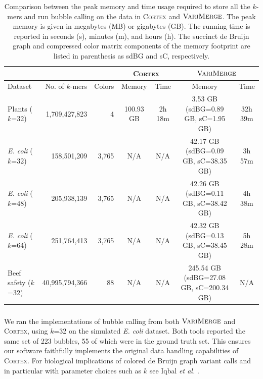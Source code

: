 \begin{sidewayspage}

\begin{table}[h]
\caption{Comparison between the peak memory and time usage required to store all the $k$-mers and run bubble calling on the data in \textsc{Cortex} and $\mbox{\rm {\sc VariMerge}}$.
The peak memory is given in megabytes (MB) or gigabytes (GB). The running time is reported in seconds (s), minutes (m), and hours (h).  The succinct de Bruijn graph and compressed color matrix components of the memory footprint are listed in parenthesis as sdBG and sC, respectively.}

  \centering
  \begin{tabular}{| l | r | r | c | c | c |c |}
\hline
\multicolumn{1}{|l}{}
& \multicolumn{1}{r}{}
& \multicolumn{1}{r}{}
& \multicolumn{2}{|c|}{\textsc{Cortex}}
& \multicolumn{2}{|c|}{$\mbox{\rm {\sc VariMerge}}$}  \\
\hline
Dataset & No. of $k$-mers & Colors & Memory & Time & Memory & Time \\
\hline
Plants	($k$=32)				& 1,709,427,823 	& 4 	& 100.93 GB 	& 2h 18m	& 3.53 GB (sdBG=0.89 GB, sC=1.95 GB) 	& 32h 39m \\
\emph{E. coli}  ($k$=32)         & 158,501,209       & 3,765 & N/A        & N/A      &  42.17 GB (sdBG=0.09 GB, sC=38.35 GB)     & 3h 57m  \\
\emph{E. coli}  ($k$=48)         & 205,938,139       & 3,765 & N/A        & N/A      &  42.26 GB (sdBG=0.11 GB, sC=38.42 GB)     & 4h 38m  \\
\emph{E. coli}  ($k$=64)         & 251,764,413       & 3,765 & N/A        & N/A      &  42.32 GB (sdBG=0.13 GB, sC=38.45 GB)     & 5h 28m  \\
Beef safety ($k$=32)                            & 40,995,794,366    & 88    & N/A        & N/A   & 245.54 GB (sdBG=27.08 GB, sC=200.34 GB)     & N/A \\
\hline
  \end{tabular}
\label{tbl-cosmo}
\end{table}
\end{sidewayspage}

\subsubsection{}

We ran the implementations of bubble calling from both $\mbox{\rm {\sc VariMerge}}$ and \textsc{Cortex}, using $k$=32 on the simulated \emph{E. coli} dataset.  Both tools reported the same set of 223 bubbles, 55 of which were in the ground truth set.  This ensures our software faithfully implements the original data handling capabilities of \textsc{Cortex}.  For biological implications of colored de Bruijn graph variant calls and in particular with parameter choices such as $k$ see Iqbal \emph{et al.} \citep{ICTFM12}.

